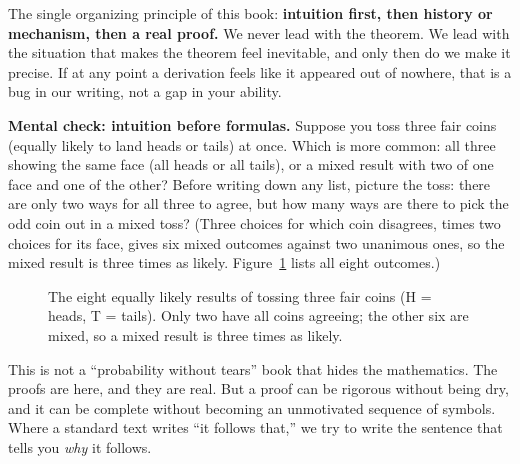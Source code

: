 \begin{focusbox}
The single organizing principle of this book: \textbf{intuition first, then
history or mechanism, then a real proof.} We never lead with the theorem. We
lead with the situation that makes the theorem feel inevitable, and only then do
we make it precise. If at any point a derivation feels like it appeared out of
nowhere, that is a bug in our writing, not a gap in your ability.
\end{focusbox}

\begin{recoverybox}
\textbf{Mental check: intuition before formulas.} Suppose you toss three fair coins (equally likely to land heads or tails) at once. Which is more common: all three showing the same face (all heads or all tails), or a mixed result with two of one face and one of the other? Before writing down any list, picture the toss: there are only two ways for all three to agree, but how many ways are there to pick the odd coin out in a mixed toss? (Three choices for which coin disagrees, times two choices for its face, gives six mixed outcomes against two unanimous ones, so the mixed result is three times as likely. Figure~\ref{ch00:three-coins} lists all eight outcomes.)
\end{recoverybox}

\begin{figure}[htbp]
\centering
{}
\caption{The eight equally likely results of tossing three fair coins
(H = heads, T = tails). Only two have all coins agreeing; the other six are
mixed, so a mixed result is three times as likely.}
\label{ch00:three-coins}
\end{figure}

This is not a ``probability without tears'' book that hides the mathematics.
The proofs are here, and they are real. But a proof can be rigorous without
being dry, and it can be complete without becoming an unmotivated sequence of
symbols. Where a
standard text writes ``it follows that,'' we try to write the sentence that
tells you \emph{why} it follows.

